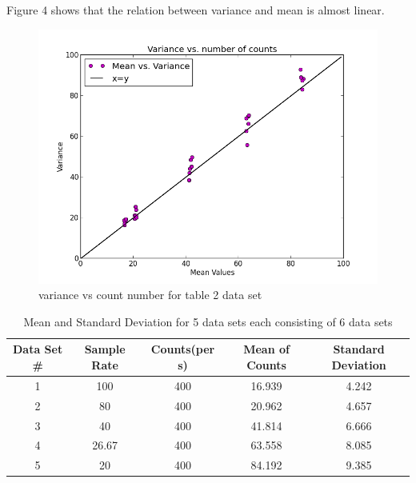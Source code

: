 \documentclass[letterpaper,12pt]{article}
\begin{document}
Figure 4 shows that the relation between variance and mean is almost linear.

\begin{figure}
\centering
\includegraphics[scale=0.6]{variance-all-together.png}
\caption{variance vs count number for table 2 data set}
\end{figure}



\begin{table}[ht]
\caption{Mean and Standard Deviation for 5 data sets each consisting of 6 data sets} %
\centering %
\begin{tabular}{c c c c c} %
\hline\hline %
Data Set \# & Sample Rate & Counts(per s) & Mean of Counts & Standard Deviation \\ [0.5ex] %
\hline %
1 & 100 & 400 & 16.939 & 4.242\\ %
2 & 80 & 400& 20.962  & 4.657 \\
3 & 40 & 400& 41.814 &  6.666 \\
4 & 26.67 & 400 & 63.558 & 8.085   \\
5 & 20 & 400 & 84.192 &  9.385 \\  [1ex] %
\hline %
\end{tabular}
\label{table:nonlin} %
\end{table}
\end{document}
